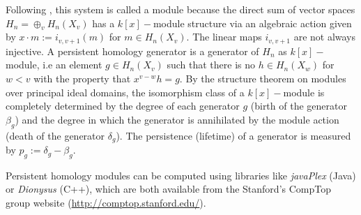 \documentclass[preprintnumbers,showpacs, showkeys, twocolumn,secnumarabic,amssymb,amsmath,amsfonts,aps, pre]{revtex4-1}
\begin{document}
Following \cite{Pers}, this system is called a module because the direct sum of vector spaces $H_n=\oplus_v H_n(X_v)$ has a $k[x]-$module structure via an algebraic action given by $x\cdot m:=i_{v,v+1}(m)$ for $m\in H_n(X_v)$. The linear maps $i_{v,v+1}$ are not always injective.
A persistent homology generator is a generator of $H_n$ as $k[x]-$module, i.e an element $g \in H_n(X_v)$ such that there is no $h \in H_n(X_w)$ for $ w<v$ with the property that $x^{v-w}h=g.$
By the structure theorem on modules over principal ideal domains, the isomorphism class of a $k[x]-$module is completely determined by the degree of each generator $g$ (birth of the generator $\beta_{g}$) and the degree in which the generator is annihilated by the module action (death of the generator $\delta_{g}$). The persistence (lifetime) of a generator is measured by $p_g:=\delta_g-\beta_g$.

Persistent homology modules can be computed using libraries like {\it javaPlex} (Java) or {\it Dionysus} (C++), which are both available from the Stanford's CompTop group website (\url{http://comptop.stanford.edu/}).









\hfill





 
\end{document}
